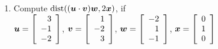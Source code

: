\begin{enumerate}[!HW!, start=1]
\begin{multicols}{4}
\itemspade Compute $\Vert\bb u\Vert$, if\\ $\boldsymbol{u} = \vr{ 7\\ 1\\ 5}$\columnbreak %
\itemspade Compute $\Vert\bb u\Vert$, if\\ $\boldsymbol{u} = \vr{2\\ 1\\ -3\\ 2}$\columnbreak %

\itemspade Compute $\Vert\bb u\Vert$, if\\ $\bb u = \mtx{c}{2-i\\ 4i\\ 1+i}$\columnbreak

\itemspade Compute $\Vert\bb u\Vert$, if\\ $\bb u = \mtx{c}{6\\ 1+4i\\ 6-2i}$
\end{multicols}

\itemspade Compute $\dist(\bb u, \bb v)$, if\\ $\boldsymbol{u} = \vr{ 1\\ 1\\ 1}$,  $\boldsymbol{v} = \vr{5\\ 2\\ 2}$ %


\itemspade Compute $\dist(\bb u-\bb v, 2\bb w + \bb x)$, if\\ $\boldsymbol{u} = \vr{ 1\\ -2\\ 1}$, $\boldsymbol{v} = \vr{ 0\\ -5\\ 3}$, $\boldsymbol{w} = \vr{ 3\\ -1\\ -2}$,  $\boldsymbol{x} = \vr{ 0\\ 1\\ 0}$ %

\item\label{exer:computerdotstop} Compute $\operatorname*{dist}((\boldsymbol{u} \cdot \boldsymbol{v})\boldsymbol{w}, 2\boldsymbol{x})$, if\\ $\boldsymbol{u} = \left[\begin{array}{r}  3\\ -1\\ -2 \end{array}\right]$, $\boldsymbol{v} = \left[\begin{array}{r}  1\\ -2\\ 3 \end{array}\right]$, $\boldsymbol{w} = \left[\begin{array}{r}  -2\\ 1\\ -1 \end{array}\right]$, $\boldsymbol{x} = \vr{ 0\\ 1\\ 0}$ %
\end{enumerate}

